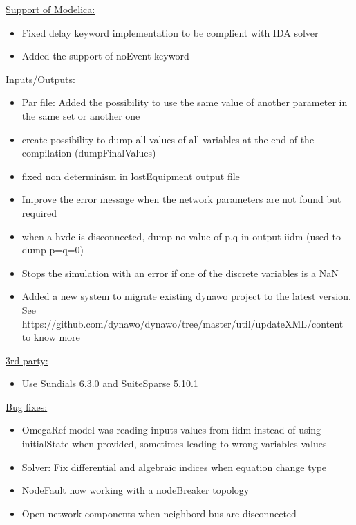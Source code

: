 \documentclass[a4paper, 12pt]{report}
\begin{document}
\underline{Support of Modelica:}

\begin{itemize}
\item Fixed delay keyword implementation to be complient with IDA solver
\item Added the support of noEvent keyword
\end{itemize}

\underline{Inputs/Outputs:}

\begin{itemize}
\item Par file: Added the possibility to use the same value of another parameter in the same set or another one
\item create possibility to dump all values of all variables at the end of the compilation (dumpFinalValues)
\item fixed non determinism in lostEquipment output file
\item Improve the error message when the network parameters are not found but required
\item when a hvdc is disconnected, dump no value of p,q in output iidm (used to dump p=q=0)
\item Stops the simulation with an error if one of the discrete variables is a NaN
\item Added a new system to migrate existing dynawo project to the latest version. See https://github.com/dynawo/dynawo/tree/master/util/updateXML/content to know more
\end{itemize}

\underline{3rd party:}

\begin{itemize}
\item Use Sundials 6.3.0 and SuiteSparse 5.10.1
\end{itemize}

\underline{Bug fixes:}

\begin{itemize}
\item OmegaRef model was reading inputs values from iidm instead of using initialState when provided, sometimes leading to wrong variables values
\item Solver: Fix differential and algebraic indices when equation change type
\item NodeFault now working with a nodeBreaker topology
\item Open network components when neighbord bus are disconnected
\end{itemize}
\end{document}
